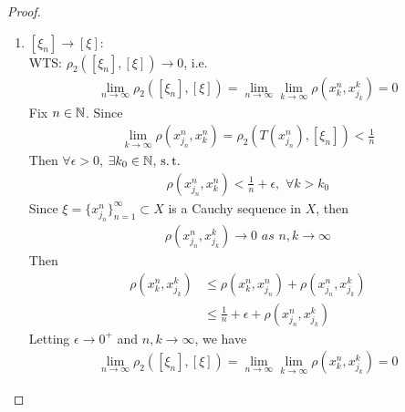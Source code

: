 \begin{thm}
\begin{proof}
\begin{enumerate}
\begin{enumerate}
					\vspace{4em}
					
					\item $[\xi_n] \to [\xi]$: \\
					WTS: $\rho_2([\xi_n] , [\xi]) \to 0$, i.e.
					\begin{align}
						\lim_{n \to \infty}{\rho_2([\xi_n] , [\xi])} 
						= \lim_{n \to \infty} \lim_{k \to \infty}{\rho(x_{k}^n , x_{j_k}^k)}
						= 0
					\end{align}
					Fix $n \in \mathbb{N}$. Since
					\begin{align}
						\lim_{k \to \infty}{\rho(x_{j_n}^n , x_{k}^{n})} = \rho_{2}(T(x_{j_n}^n) , [\xi_n]) < \frac{1}{n}
					\end{align}
					Then $\forall \epsilon > 0$, $\exists k_0 \in \mathbb{N}$, $\operatorname{s.t.}$
					\begin{align}
						\rho(x_{j_n}^n , x_{k}^n) < \frac{1}{n} + \epsilon , \,\, \forall k > k_0
					\end{align}
					Since $\xi = \{ x_{j_n}^n \}_{n = 1}^{\infty} \subset X$ is a Cauchy sequence in $X$, then 
					\begin{align}
						\rho(x_{j_n}^n , x_{j_k}^k) \to 0 \,\, as \,\, n , k \to \infty
					\end{align}
					Then
					\begin{align}
						\rho(x_{k}^n , x_{j_k}^k) 
						&\leq \rho(x_{k}^n , x_{j_n}^n) + \rho(x_{j_n}^n , x_{j_k}^k) \\
						&\leq \frac{1}{n} + \epsilon + \rho(x_{j_n}^n , x_{j_k}^k)
					\end{align}
					Letting $\epsilon \to 0^{+}$ and $n , k \to \infty$, we have
					\begin{align}
						\lim_{n \to \infty}{\rho_2([\xi_n] , [\xi])} 
						= \lim_{n \to \infty} \lim_{k \to \infty}{\rho(x_{k}^n , x_{j_k}^k)}
						= 0
					\end{align}
				\end{enumerate}
				
				\newpage
				

\end{enumerate}
\end{proof}
\end{thm}
